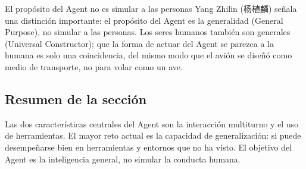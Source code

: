 \begin{knowledgebox}{El propósito del Agent no es simular a las personas}
Yang Zhilin (杨植麟) señala una distinción importante: el propósito del Agent es la generalidad (General Purpose), no simular a las personas. Los seres humanos también son generales (Universal Constructor); que la forma de actuar del Agent se parezca a la humana es solo una coincidencia, del mismo modo que el avión se diseñó como medio de transporte, no para volar como un ave.
\end{knowledgebox}

\subsection{Resumen de la sección}

Las dos características centrales del Agent son la interacción multiturno y el uso de herramientas. El mayor reto actual es la capacidad de generalización: si puede desempeñarse bien en herramientas y entornos que no ha visto. El objetivo del Agent es la inteligencia general, no simular la conducta humana.

